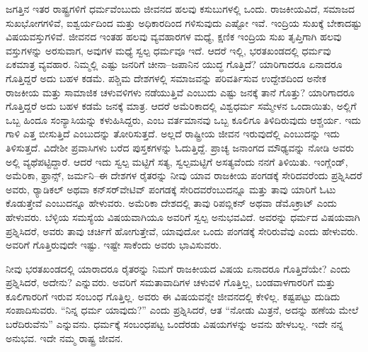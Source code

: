 ಜಗತ್ತಿನ ಇತರ ರಾಷ್ಟ್ರಗಳಿಗೆ ಧರ್ಮವೆಂಬುದು ಜೀವನದ ಹಲವು ಕಸುಬುಗಳಲ್ಲಿ ಒಂದು. ರಾಜಕೀಯವಿದೆ, ಸಮಾಜದ ಸುಖಭೋಗಗಳಿವೆ, ಐಶ್ವರ್ಯದಿಂದ ಮತ್ತು ಅಧಿಕಾರದಿಂದ ಗಳಿಸುವುದು ಎಷ್ಟೋ ಇವೆ. ಇಂದ್ರಿಯ ಸುಖಕ್ಕೆ ಬೇಕಾದಷ್ಟು ವಿಷಯವಸ್ತುಗಳಿವೆ. ಜೀವನದ ಇಂತಹ ಹಲವು ವ್ಯವಹಾರಗಳ ಮಧ್ಯೆ, ಕ್ಷಣಿಕ ಇಂದ್ರಿಯ ಸುಖ ತೃಪ್ತಿಗಾಗಿ ಹಲವು ವಸ್ತುಗಳನ್ನು ಅರಸುವಾಗ, ಅವುಗಳ ಮಧ್ಯೆ ಸ್ವಲ್ಪ ಧರ್ಮವೂ ಇದೆ. ಆದರೆ ಇಲ್ಲಿ, ಭರತಖಂಡದಲ್ಲಿ ಧರ್ಮವು ಏಕಮಾತ್ರ ವ್ಯವಹಾರ. ನಿಮ್ಮಲ್ಲಿ ಎಷ್ಟು ಜನರಿಗೆ ಚೀನಾ–ಜಪಾನಿನ ಯುದ್ಧ ಗೊತ್ತಿದೆ? ಯಾರಿಗಾದರೂ ಏನಾದರೂ ಗೊತ್ತಿದ್ದರೆ ಅದು ಬಹಳ ಕಡಮೆ. ಪಶ್ಚಿಮ ದೇಶಗಳಲ್ಲಿ ಸಮಾಜವನ್ನು ಪರಿವರ್ತಿಸುವ ಉದ್ದೇಶದಿಂದ ಅನೇಕ ರಾಜಕೀಯ ಮತ್ತು ಸಾಮಾಜಿಕ ಚಳುವಳಿಗಳು ನಡೆಯುತ್ತಿವೆ ಎಂಬುದು ಎಷ್ಟು ಜನಕ್ಕೆ ತಾನೆ ಗೊತ್ತು? ಯಾರಿಗಾದರೂ ಗೊತ್ತಿದ್ದರೆ ಅದು ಬಹಳ ಕಡಮೆ ಜನಕ್ಕೆ ಮಾತ್ರ. ಆದರೆ ಅಮೆರಿಕಾದಲ್ಲಿ ವಿಶ್ವಧರ್ಮ ಸಮ್ಮೇಳನ ಒಂದಾಯಿತು, ಅಲ್ಲಿಗೆ ಒಬ್ಬ ಹಿಂದೂ ಸಂನ್ಯಾಸಿಯನ್ನು ಕಳುಹಿಸಿದ್ದರು, ಎಂಬ ವರ್ತಮಾನವು ಒಬ್ಬ ಕೂಲಿಗೂ ತಿಳಿದಿರುವುದು ಆಶ್ಚರ್ಯ. ಇದು ಗಾಳಿ ಎತ್ತ ಬೀಸುತ್ತಿದೆ ಎಂಬುದನ್ನು ತೋರಿಸುತ್ತದೆ. ಅಲ್ಲದೆ ರಾಷ್ಟ್ರೀಯ ಜೀವನ ಇರುವುದೆಲ್ಲಿ ಎಂಬುದನ್ನು ಇದು ತಿಳಿಸುತ್ತದೆ. ವಿದೇಶೀ ಪ್ರವಾಸಿಗಳು ಬರೆದ ಪುಸ್ತಕಗಳನ್ನು ಓದುತ್ತಿದ್ದೆ. ಪ್ರಾಚ್ಯ ಜನಾಂಗದ ಮೌಢ್ಯವನ್ನು ನೋಡಿ ಅವರು ಅಲ್ಲಿ ವ್ಯಥೆಪಟ್ಟಿದ್ದಾರೆ. ಆದರೆ ಇದು ಸ್ವಲ್ಪ ಮಟ್ಟಿಗೆ ಸತ್ಯ, ಸ್ವಲ್ಪಮಟ್ಟಿಗೆ ಅಸತ್ಯವೆಂದು ನನಗೆ ತಿಳಿಯಿತು. ಇಂಗ್ಲೆಂಡ್​, ಅಮೆರಿಕಾ, ಫ್ರಾನ್ಸ್, ಜರ್ಮನಿ–ಈ ದೇಶಗಳ ರೈತರನ್ನು ನೀವು ಯಾವ ರಾಜಕೀಯ ಪಂಗಡಕ್ಕೆ ಸೇರಿದವರೆಂದು ಪ್ರಶ್ನಿಸಿದರೆ ಅವರು, ರ‌್ಯಾಡಿಕಲ್​ ಅಥವಾ ಕನ್​ಸರ್​ವೇಟಿವ್​ ಪಂಗಡಕ್ಕೆ ಸೇರಿದವರೆಂಬುದನ್ನೂ ಮತ್ತು ತಾವು ಯಾರಿಗೆ ಓಟು ಕೊಡುತ್ತೇವೆ ಎಂಬುದನ್ನೂ ಹೇಳುವರು. ಅಮೆರಿಕಾ ದೇಶದಲ್ಲಿ ತಾವು ರಿಪಬ್ಲಿಕನ್​ ಅಥವಾ ಡೆಮೊಕ್ರಾಟ್​ ಎಂದು ಹೇಳುವರು. ಬೆಳ್ಳಿಯ ಸಮಸ್ಯೆಯ ವಿಷಯವಾಗಿಯೂ ಅವರಿಗೆ ಸ್ವಲ್ಪ ಅನುಭವವಿದೆ. ಅವರನ್ನು ಧರ್ಮದ ವಿಷಯವಾಗಿ ಪ್ರಶ್ನಿಸಿದರೆ, ಅವರು ತಾವು ಚರ್ಚಿಗೆ ಹೋಗುತ್ತೇವೆ, ಯಾವುದೋ ಒಂದು ಪಂಗಡಕ್ಕೆ ಸೇರಿರುವೆವು ಎಂದು ಹೇಳುವರು. ಅವರಿಗೆ ಗೊತ್ತಿರುವುದೇ ಇಷ್ಟು. ಇಷ್ಟೇ ಸಾಕೆಂದು ಅವರು ಭಾವಿಸುವರು.

ನೀವು ಭರತಖಂಡದಲ್ಲಿ ಯಾರಾದರೂ ರೈತರನ್ನು ನಿಮಗೆ ರಾಜಕೀಯದ ವಿಷಯ ಏನಾದರೂ ಗೊತ್ತಿದೆಯೇ? ಎಂದು ಪ್ರಶ್ನಿಸಿದರೆ, ಅದೇನು? ಎನ್ನುವರು. ಅವರಿಗೆ ಸಮತಾವಾದಿಗಳ ಚಳುವಳಿ ಗೊತ್ತಿಲ್ಲ, ಬಂಡವಾಳಗಾರರಿಗೆ ಮತ್ತು ಕೂಲಿಗಾರರಿಗೆ ಇರುವ ಸಂಬಂಧ ಗೊತ್ತಿಲ್ಲ. ಅವರು ಈ ವಿಷಯವನ್ನೇ ಜೀವನದಲ್ಲಿ ಕೇಳಿಲ್ಲ. ಕಷ್ಟಪಟ್ಟು ದುಡಿದು ಸಂಪಾದಿಸುವರು. “ನಿನ್ನ ಧರ್ಮ ಯಾವುದು?” ಎಂದು ಪ್ರಶ್ನಿಸಿದರೆ, ಆತ “ನೋಡು ಮಿತ್ರನೆ, ಅದನ್ನು ಹಣೆಯ ಮೇಲೆ ಬರೆದಿರುವೆನು” ಎನ್ನುವನು. ಧರ್ಮಕ್ಕೆ ಸಂಬಂಧಪಟ್ಟ ಒಂದೆರಡು ವಿಷಯಗಳನ್ನು ಅವನು ಹೇಳಬಲ್ಲ. ಇದೇ ನನ್ನ ಅನುಭವ. ಇದೇ ನಮ್ಮ ರಾಷ್ಟ್ರ ಜೀವನ.

